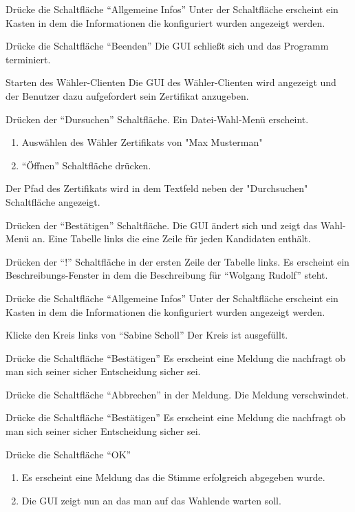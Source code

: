 \documentclass[parskip=full]{scrartcl}
\begin{document}
\teststep{}
		{Drücke die Schaltfläche \enquote{Allgemeine Infos}}
		{Unter der Schaltfläche erscheint ein Kasten in dem die Informationen die konfiguriert wurden angezeigt werden.}

\teststep{}
		{Drücke die Schaltfläche \enquote{Beenden}}
		{Die GUI schließt sich und das Programm terminiert.}

\teststep{}
		{Starten des Wähler-Clienten}
		{Die GUI des Wähler-Clienten wird angezeigt und der Benutzer dazu aufgefordert sein Zertifikat anzugeben.}

\teststep{}
		{Drücken der \enquote{Dursuchen} Schaltfläche.}
		{Ein Datei-Wahl-Menü erscheint.}
	
\teststep{}
		{\begin{enumerate}
				\item Auswählen des Wähler Zertifikats von "Max Musterman"
				\item \enquote{Öffnen} Schaltfläche drücken.
		\end{enumerate}}
		{Der Pfad des Zertifikats wird in dem Textfeld neben der "Durchsuchen" Schaltfläche angezeigt.}
		
\teststep{}
		{Drücken der \enquote{Bestätigen} Schaltfläche.}
		{Die GUI ändert sich und zeigt das Wahl-Menü an. Eine Tabelle links die eine Zeile für jeden Kandidaten enthält.}

\teststep{}
		{Drücken der \enquote{!} Schaltfläche in der ersten Zeile der Tabelle links.}
		{Es erscheint ein Beschreibungs-Fenster in dem die Beschreibung für \enquote{Wolgang Rudolf} steht.}

\teststep{}
		{Drücke die Schaltfläche \enquote{Allgemeine Infos}}
		{Unter der Schaltfläche erscheint ein Kasten in dem die Informationen die konfiguriert wurden angezeigt werden.}

\teststep{}
		{Klicke den Kreis links von \enquote{Sabine Scholl}}
		{Der Kreis ist ausgefüllt.}
	
\teststep{}
		{Drücke die Schaltfläche \enquote{Bestätigen}}
		{Es erscheint eine Meldung die nachfragt ob man sich seiner sicher Entscheidung sicher sei.}

\teststep{}
		{Drücke die Schaltfläche \enquote{Abbrechen} in der Meldung.}
		{Die Meldung verschwindet.}
			

\teststep{}
		{Drücke die Schaltfläche \enquote{Bestätigen}}
		{Es erscheint eine Meldung die nachfragt ob man sich seiner sicher Entscheidung sicher sei.}

\teststep{}
		{Drücke die Schaltfläche \enquote{OK}}
		{\begin{enumerate}
			\item Es erscheint eine Meldung das die Stimme erfolgreich abgegeben wurde.
			\item Die GUI zeigt nun an das man auf das Wahlende warten soll.
		\end{enumerate}}
\end{document}
